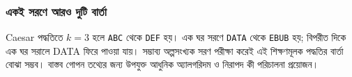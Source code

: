 \subsubsection{একই সরণে আরও দুটি বার্তা}
Caesar পদ্ধতিতে $k=3$ হলে \texttt{ABC} থেকে \texttt{DEF} হয়। এক ঘর সরণে \texttt{DATA} থেকে \texttt{EBUB} হয়; বিপরীত দিকে এক ঘর সরালে DATA ফিরে পাওয়া যায়। সম্ভাব্য অল্পসংখ্যক সরণ পরীক্ষা করেই এই শিক্ষণমূলক পদ্ধতির বার্তা বোঝা সম্ভব। বাস্তব গোপন তথ্যের জন্য উপযুক্ত আধুনিক অ্যালগরিদম ও নিরাপদ কী পরিচালনা প্রয়োজন।

